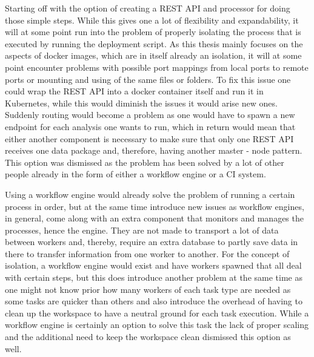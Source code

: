 Starting off with the option of creating a REST API and processor for doing those simple steps. While this gives one a lot of flexibility and expandability, it will at some point run into the problem of properly isolating the process that is executed by running the deployment script. As this thesis mainly focuses on the aspects of docker images, which are in itself already an isolation, it will at some point encounter problems with possible port mappings from local ports to remote ports or mounting and using of the same files or folders. To fix this issue one could wrap the REST API into a docker container itself and run it in Kubernetes, while this would diminish the issues it would arise new ones. Suddenly routing would become a problem as one would have to spawn a new endpoint for each analysis one wants to run, which in return would mean that either another component is necessary to make sure that only one REST API receives one data package and, therefore, having another master - node pattern.
This option was dismissed as the problem has been solved by a lot of other people already in the form of either a workflow engine or a CI system.

Using a workflow engine would already solve the problem of running a certain process in order, but at the same time introduce new issues as workflow engines, in general, come along with an extra component that monitors and manages the processes, hence the engine. They are not made to transport a lot of data between workers and, thereby, require an extra database to partly save data in there to transfer information from one worker to another. For the concept of isolation, a workflow engine would exist and have workers spawned that all deal with certain steps, but this does introduce another problem at the same time as one might not know prior how many workers of each task type are needed as some tasks are quicker than others and also introduce the overhead of having to clean up the workspace to have a neutral ground for each task execution. While a workflow engine is certainly an option to solve this task the lack of proper scaling and the additional need to keep the workspace clean dismissed this option as well.

